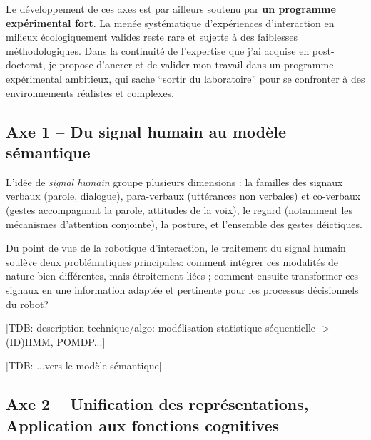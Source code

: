 \documentclass[a4paper]{article}
\begin{document}
Le développement de ces axes est par ailleurs soutenu par \textbf{un programme
expérimental fort}. La menée systématique d'expériences d'interaction en milieux
écologiquement valides reste rare et sujette à des faiblesses méthodologiques.
Dans la continuité de l'expertise que j'ai acquise en post-doctorat, je propose
d'ancrer et de valider mon travail dans un programme expérimental ambitieux, qui
sache ``sortir du laboratoire'' pour se confronter à des environnements
réalistes et complexes.

\subsection*{Axe 1 -- Du signal humain au modèle sémantique}

L'idée de \emph{signal humain} groupe plusieurs dimensions : la familles des
signaux verbaux (parole, dialogue), para-verbaux (uttérances non verbales) et
co-verbaux (gestes accompagnant la parole, attitudes de la voix), le regard
(notamment les mécanismes d'attention conjointe), la posture, et l'ensemble des
gestes déictiques.

Du point de vue de la robotique d'interaction, le traitement du signal humain
soulève deux problématiques principales: comment intégrer ces 
modalités de nature bien différentes, mais étroitement liées ; comment ensuite
transformer ces signaux en une information adaptée et pertinente pour les
processus décisionnels du robot?

[TDB: description technique/algo: modélisation statistique séquentielle ->
(ID)HMM, POMDP...]

[TDB: ...vers le modèle sémantique]

\subsection*{Axe 2 -- Unification des représentations, Application aux fonctions
cognitives}
\end{document}
